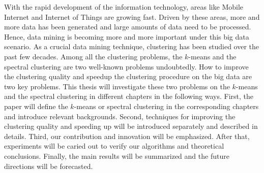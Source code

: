 
\begin{englishabstract}
	With the rapid development of the information technology, areas like Mobile Internet and Internet of Things are
growing fast. Driven by these areas, more and more data has been generated and large amounts of data need to be processed.
Hence, data mining is becoming more and more important under this big data scenario. As a crucial data mining technique,
clustering has been studied over the past few decades. Among all the clustering problems, the $k$-means and the spectral clustering are two well-known problems undoubtedly. How to improve the clustering quality and speedup the clustering procedure on the big data are two key problems. This thesis will investigate these two problems on the $k$-means and the spectral clustering in different chapters in the following ways. First, the paper will define the $k$-means or spectral clustering in the corresponding chapters and introduce relevant backgrounds. Second, techniques for improving the clustering quality and speeding up will be introduced separately and described in details. Third, our contribution and innovation will be emphasized. After that, experiments will be caried out to verify our algorithms and theoretical conclusions. Finally, the main results will be summarized and the future directions will be forecasted.

\end{englishabstract}


